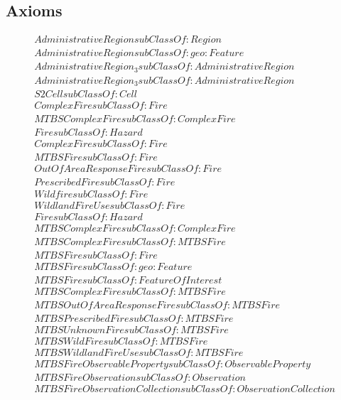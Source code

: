 \subsection{Axioms}
\begin{align}
  AdministrativeRegion subClassOf: Region\\
  AdministrativeRegion subClassOf: geo:Feature\\
  AdministrativeRegion_3 subClassOf: AdministrativeRegion\\
  AdministrativeRegion_3 subClassOf: AdministrativeRegion\\
  S2Cell subClassOf: Cell\\
  ComplexFire subClassOf: Fire\\
  MTBSComplexFire subClassOf: ComplexFire\\
  Fire subClassOf: Hazard\\
  ComplexFire subClassOf: Fire\\
  MTBSFire subClassOf: Fire\\
  OutOfAreaResponseFire subClassOf: Fire\\
  PrescribedFire subClassOf: Fire\\
  Wildfire subClassOf: Fire\\
  WildlandFireUse subClassOf: Fire\\
  Fire subClassOf: Hazard\\
  MTBSComplexFire subClassOf: ComplexFire\\
  MTBSComplexFire subClassOf: MTBSFire\\
  MTBSFire subClassOf: Fire\\
  MTBSFire subClassOf: geo:Feature\\
  MTBSFire subClassOf: FeatureOfInterest\\
  MTBSComplexFire subClassOf: MTBSFire\\
  MTBSOutOfAreaResponseFire subClassOf: MTBSFire\\
  MTBSPrescribedFire subClassOf: MTBSFire\\
  MTBSUnknownFire subClassOf: MTBSFire\\
  MTBSWildFire subClassOf: MTBSFire\\
  MTBSWildlandFireUse subClassOf: MTBSFire\\
  MTBSFireObservableProperty subClassOf: ObservableProperty\\
  MTBSFireObservation subClassOf: Observation\\
  MTBSFireObservationCollection subClassOf: ObservationCollection\\

\end{align}
